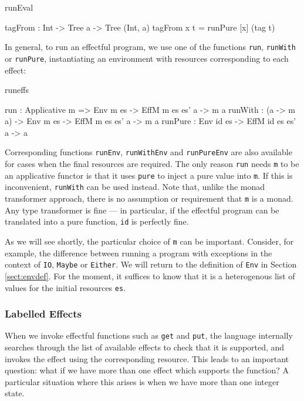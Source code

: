 \begin{SaveVerbatim}{runEval}

tagFrom : Int -> Tree a -> Tree (Int, a)
tagFrom x t = runPure [x] (tag t)

\end{SaveVerbatim}

\noindent
In general, to run an effectful program, we use one of the functions
\texttt{run}, \texttt{runWith} or \texttt{runPure}, instantiating an
environment with resources corresponding to each effect:

\begin{SaveVerbatim}{runeffs}

run     : Applicative m => 
          Env m es -> EffM m es es' a -> m a
runWith : (a -> m a) -> 
          Env m es -> EffM m es es' a -> m a
runPure : Env id es -> EffM id es es' a -> a

\end{SaveVerbatim}

\noindent
Corresponding functions \texttt{runEnv}, \texttt{runWithEnv} and
\texttt{runPureEnv} are also available for cases when the final resources are
required.  The only reason \texttt{run} needs \texttt{m} to be an applicative
functor
is that it uses \texttt{pure} to inject a pure value into \texttt{m}. If this
is inconvenient, \texttt{runWith} can be used instead. Note that, unlike the
monad transformer approach, there is no assumption or requirement that
\texttt{m} is a monad. Any type transformer is fine --- in particular,
if the effectful program can be translated into a pure function, \texttt{id}
is perfectly fine.

As we will see shortly, the particular choice of \texttt{m} can be
important. Consider, for example, the difference between running a program with
exceptions in the context of \texttt{IO}, \texttt{Maybe} or \texttt{Either}.
%
We will return to the definition of \texttt{Env} in Section \ref{sect:envdef}.
For the moment, it suffices to know that it is a heterogenous list of values
for the initial resources \texttt{es}.

\subsubsection{Labelled Effects}

When we invoke effectful functions such as \texttt{get} and \texttt{put},
the \Eff{} language internally searches through the list of available effects
to check that it is supported, and invokes the effect using the corresponding
resource. This leads to an important question: what if we have more than one 
effect which supports the function? A particular situation where this arises
is when we have more than one integer state.

